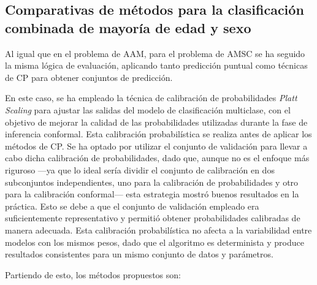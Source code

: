 
\subsection{Comparativas de métodos para la clasificación combinada de mayoría de edad y sexo}

Al igual que en el problema de AAM, para el problema de AMSC se ha seguido la misma lógica de evaluación, 
aplicando tanto predicción puntual como técnicas de CP para obtener conjuntos de predicción. 

En este caso, se ha empleado la técnica de calibración de probabilidades \textit{Platt Scaling} para ajustar 
las salidas del modelo de clasificación multiclase, con el objetivo de mejorar la calidad de las 
probabilidades utilizadas durante la fase de inferencia conformal. Esta calibración probabilística se 
realiza antes de aplicar los métodos de CP.
Se ha optado por utilizar el conjunto de validación para llevar a cabo dicha calibración de probabilidades, 
dado que, aunque no es el enfoque más riguroso ---ya que lo ideal sería dividir el conjunto de calibración en 
dos subconjuntos independientes, uno para la calibración de probabilidades y otro para la calibración 
conformal--- esta estrategia mostró buenos resultados en la práctica. Esto se debe a que el conjunto de 
validación empleado era suficientemente representativo y permitió obtener probabilidades calibradas de manera 
adecuada. Esta calibración probabilística no afecta a la variabilidad entre modelos con los mismos pesos, 
dado que el algoritmo es determinista y produce resultados consistentes para un mismo conjunto de datos y 
parámetros. 

Partiendo de esto, los métodos propuestos son:

